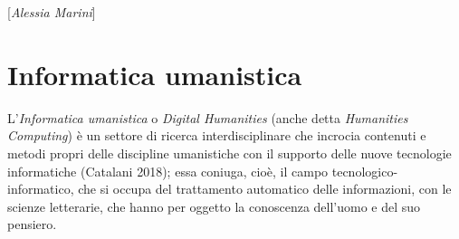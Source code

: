 {{{[}\emph{Alessia Marini}{]}



\chapter{Informatica umanistica}

L'\emph{Informatica umanistica} o \emph{Digital Humanities} (anche detta
\emph{Humanities Computing}) è un settore di ricerca interdisciplinare
che incrocia contenuti e metodi propri delle discipline umanistiche con
il supporto delle nuove tecnologie informatiche (Catalani 2018); essa
coniuga, cioè, il campo tecnologico-informatico, che si occupa del
trattamento automatico delle informazioni, con le scienze letterarie,
che hanno per oggetto la conoscenza dell'uomo e del suo pensiero.

}}
